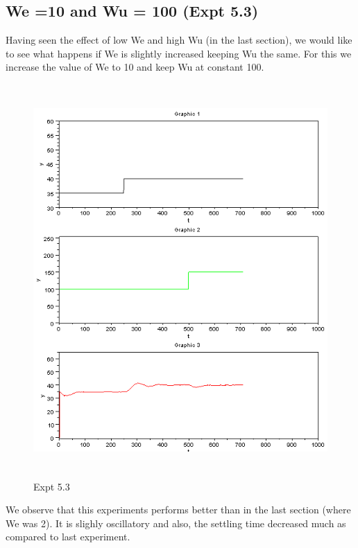 \subsection{We =10 and Wu = 100 (Expt 5.3)}
Having seen the effect of low We and high Wu (in the last section), we would like to see what happens if We is slightly increased keeping Wu the same. For this we increase the value of We to 10 and keep Wu at constant 100.
\begin{figure}[H]
  \includegraphics[width=12cm, height=15cm]{mpc/5_3.PNG}
  \caption{Expt 5.3}
\end{figure}
We observe that this experiments performs better than in the last section (where We was 2). It is slighly oscillatory and also, the settling time decreased much as compared to last experiment.
